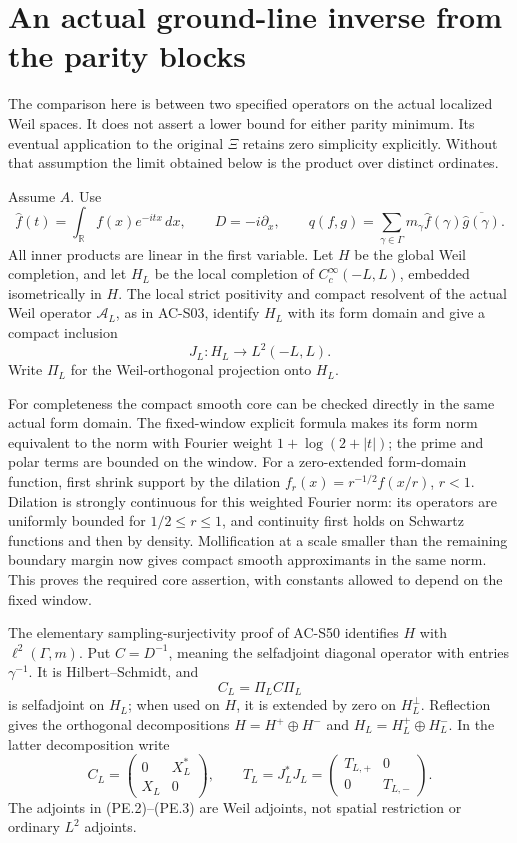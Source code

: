 \section{An actual ground-line inverse from the parity blocks}
\label{sec:spectral-parity-edge}

The comparison here is between two specified operators on the actual
localized Weil spaces.  It does not assert a lower bound for either
parity minimum.  Its eventual application to the original \(\Xi\)
retains zero simplicity explicitly.  Without that assumption the
limit obtained below is the product over distinct ordinates.

Assume \(A\).  Use
\[
 \widehat f(t)=\int_{\mathbb R}f(x)e^{-itx}\,dx,\qquad
 D=-i\partial_x,\qquad
 q(f,g)=\sum_{\gamma\in\Gamma}
       m_\gamma\widehat f(\gamma)\overline{\widehat g(\gamma)} .
 \tag{PE.1}
\]
All inner products are linear in the first variable.  Let \(H\)
be the global Weil completion, and let \(H_L\) be the local
completion of \(C_c^\infty(-L,L)\), embedded isometrically in \(H\).
The local strict positivity and compact resolvent of the actual Weil
operator \(\mathscr A_L\), as in AC-S03, identify \(H_L\) with its
form domain and give a compact inclusion
\[
 J_L:H_L\longrightarrow L^2(-L,L).
\]
Write \(\Pi_L\) for the Weil-orthogonal projection onto \(H_L\).

For completeness the compact smooth core can be checked directly
in the same actual form domain.  The fixed-window explicit formula
makes its form norm equivalent to the norm with Fourier weight
\(1+\log(2+|t|)\); the prime and polar terms are bounded on the
window.  For a zero-extended form-domain function, first shrink
support by the dilation \(f_r(x)=r^{-1/2}f(x/r)\), \(r<1\).
Dilation is strongly continuous for this weighted Fourier norm:
its operators are uniformly bounded for \(1/2\le r\le1\), and
continuity first holds on Schwartz functions and then by density.
Mollification at a scale smaller than the remaining boundary
margin now gives compact smooth approximants in the same norm.
This proves the required core assertion, with constants allowed
to depend on the fixed window.

The elementary sampling-surjectivity proof of AC-S50 identifies
\(H\) with \(\ell^2(\Gamma,m)\).  Put \(C=D^{-1}\), meaning the
selfadjoint diagonal operator with entries \(\gamma^{-1}\).
It is Hilbert--Schmidt, and
\[
 C_L=\Pi_LC\Pi_L
 \tag{PE.2}
\]
is selfadjoint on \(H_L\); when used on \(H\), it is extended by zero
on \(H_L^\perp\).  Reflection gives the orthogonal decompositions
\(H=H^+\oplus H^-\) and \(H_L=H_L^+\oplus H_L^-\).
In the latter decomposition write
\[
 C_L=
 \begin{pmatrix}0&X_L^*\\X_L&0\end{pmatrix},
 \qquad
 T_L=J_L^*J_L=
 \begin{pmatrix}T_{L,+}&0\\0&T_{L,-}\end{pmatrix}.
 \tag{PE.3}
\]
The adjoints in (PE.2)--(PE.3) are Weil adjoints, not spatial
restriction or ordinary \(L^2\) adjoints.

